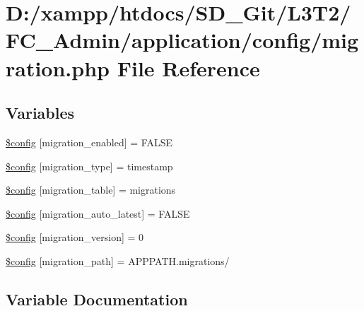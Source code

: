 \hypertarget{_admin_2application_2config_2migration_8php}{}\section{D\+:/xampp/htdocs/\+S\+D\+\_\+\+Git/\+L3\+T2/\+F\+C\+\_\+\+Admin/application/config/migration.php File Reference}
\label{_admin_2application_2config_2migration_8php}
\subsection*{Variables}
\begin{DoxyCompactItemize}
\item 
\hyperlink{_admin_2application_2config_2migration_8php_ad6392796c28d7391c3977c2cceef3cc2}{\$config} \mbox{[}\textquotesingle{}migration\+\_\+enabled\textquotesingle{}\mbox{]} = F\+A\+L\+S\+E
\item 
\hyperlink{_admin_2application_2config_2migration_8php_ad5a6eb0992227e3fabe3576b61467f11}{\$config} \mbox{[}\textquotesingle{}migration\+\_\+type\textquotesingle{}\mbox{]} = \textquotesingle{}timestamp\textquotesingle{}
\item 
\hyperlink{_admin_2application_2config_2migration_8php_ab6c0facc32c2cc46aa003a67bd841703}{\$config} \mbox{[}\textquotesingle{}migration\+\_\+table\textquotesingle{}\mbox{]} = \textquotesingle{}migrations\textquotesingle{}
\item 
\hyperlink{_admin_2application_2config_2migration_8php_ad90ceba960297b62c14da775e8c0c7db}{\$config} \mbox{[}\textquotesingle{}migration\+\_\+auto\+\_\+latest\textquotesingle{}\mbox{]} = F\+A\+L\+S\+E
\item 
\hyperlink{_admin_2application_2config_2migration_8php_a53ca48939aaf8c92f0c0d239a294fff2}{\$config} \mbox{[}\textquotesingle{}migration\+\_\+version\textquotesingle{}\mbox{]} = 0
\item 
\hyperlink{_admin_2application_2config_2migration_8php_abc04383313304e348060a7ee39f5a8ee}{\$config} \mbox{[}\textquotesingle{}migration\+\_\+path\textquotesingle{}\mbox{]} = A\+P\+P\+P\+A\+T\+H.\textquotesingle{}migrations/\textquotesingle{}
\end{DoxyCompactItemize}


\subsection{Variable Documentation}
\hypertarget{_admin_2application_2config_2migration_8php_ad6392796c28d7391c3977c2cceef3cc2}{}

